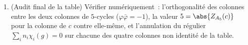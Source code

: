 \begin{problem}
\begin{enumerate}[resume]
\[        \]
        Interpréter $\Lambda^2\chi_2 = \chi_2$ géométriquement
        via le produit vectoriel sur $\R^3$.
  \item (Audit final de la table) Vérifier numériquement~:
        l'orthogonalité des colonnes entre les deux colonnes de
        $5$-cycles ($\varphi\bar\varphi = -1$), la valeur $5 =
        \abs{Z_{A_5}(c)}$ pour la colonne de $c$ contre
        elle-même, et l'annulation du  régulier
        $\sum_i n_i\chi_i(g) = 0$ sur chacune des quatre
        colonnes non identité de la table.
\end{enumerate}
\end{problem}
